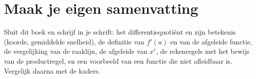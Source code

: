 
\begin{oefeningen}







\end{oefeningen}


\ifzelfstudie
\section*{Maak je eigen samenvatting}
Sluit dit boek en schrijf in je schrift: het differentiequotiënt en zijn betekenis (koorde, gemiddelde snelheid), de definitie van $f'(a)$ en van de afgeleide functie, de vergelijking van de raaklijn, de afgeleide van $x^r$, de rekenregels met het bewijs van de productregel, en een voorbeeld van een functie die niet afleidbaar is. Vergelijk daarna met de kaders.
\fi
